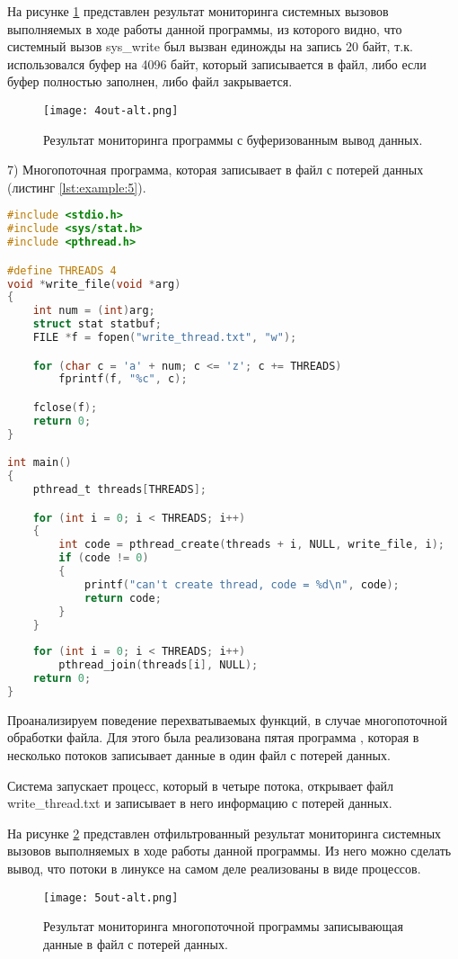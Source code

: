         На рисунке \ref{examples:4out} представлен результат мониторинга системных вызовов
        выполняемых в ходе работы данной программы, из которого видно, 
        что системный вызов sys\_write был вызван единожды на запись 20 байт,
        т.к. использовался буфер на 4096 байт, который записывается в файл, 
        либо если буфер полностью заполнен, либо файл закрывается.

        \begin{figure}[h!]
            \centering
            \texttt{[image: 4out-alt.png]}
            \caption{Результат мониторинга программы с буферизованным вывод данных.}
            \label{examples:4out}
        \end{figure}

    7) Многопоточная программа, которая записывает в файл с потерей данных (листинг \ref{lst:example:5}).        
        \begin{lstlisting}[language=C, label=lst:example:5, caption=Многопоточная программа записывающая данные в один файл]
#include <stdio.h>
#include <sys/stat.h>
#include <pthread.h>

#define THREADS 4
void *write_file(void *arg)
{
    int num = (int)arg;
    struct stat statbuf;
    FILE *f = fopen("write_thread.txt", "w");

    for (char c = 'a' + num; c <= 'z'; c += THREADS)
        fprintf(f, "%c", c);

    fclose(f);
    return 0;   
}

int main()
{
    pthread_t threads[THREADS];

    for (int i = 0; i < THREADS; i++) 
    {
        int code = pthread_create(threads + i, NULL, write_file, i);
        if (code != 0)
        {
            printf("can't create thread, code = %d\n", code);
            return code;
        }
    }
    
    for (int i = 0; i < THREADS; i++) 
        pthread_join(threads[i], NULL);
    return 0;
}
        \end{lstlisting}

        Проанализируем поведение перехватываемых функций, в случае многопоточной обработки файла.
        Для этого была реализована пятая программа ,
        которая в несколько потоков записывает данные в один файл с потерей данных.

        Система запускает процесс, который в четыре потока,
        открывает файл write\_thread.txt  и записывает в него информацию с потерей данных.
        
        На рисунке \ref{examples:5out} представлен отфильтрованный результат мониторинга системных вызовов
        выполняемых в ходе работы данной программы.
        Из него можно сделать вывод, что потоки в линуксе на самом деле реализованы в виде процессов.

    \begin{figure}[h!]
        \centering
        \texttt{[image: 5out-alt.png]}
        \caption{Результат мониторинга многопоточной программы записывающая данные в файл с потерей данных.}
        \label{examples:5out}
    \end{figure}

\pagebreak
